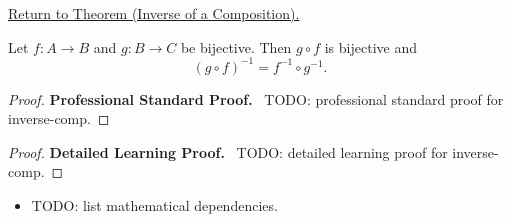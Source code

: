 \newpage
{}
\label{prf:inverse-comp}

\begin{remark*}[Return]
\hyperref[thm:inverse-comp]{Return to Theorem (Inverse of a Composition).}
\end{remark*}

\begin{theorem*}
Let $f : A \to B$ and $g : B \to C$ be bijective. Then $g \circ f$ is
bijective and
\[
(g \circ f)^{-1} = f^{-1} \circ g^{-1}.
\]
\end{theorem*}

\begin{proof}
\textbf{Professional Standard Proof.}~
TODO: professional standard proof for inverse-comp.
\end{proof}

\begin{proof}
\textbf{Detailed Learning Proof.}~
TODO: detailed learning proof for inverse-comp.
\end{proof}

\begin{remark*}
\end{remark*}

\begin{dependencies}
\begin{itemize}
  \item TODO: list mathematical dependencies.
\end{itemize}
\end{dependencies}

\clearpage
